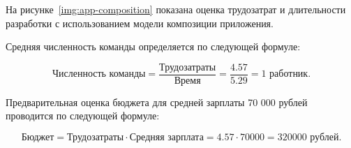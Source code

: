 На рисунке~\ref{img:app-composition} показана оценка трудозатрат и длительности разработки с использованием модели композиции приложения.


Средняя численность команды определяется по следующей формуле:

$$\text{Численность команды} = \frac{\text{Трудозатраты}}{\text{Время}} =
\frac{4.57}{5.29} = 1 \text{ работник.}$$

Предварительная оценка бюджета для средней зарплаты 70 000 рублей проводится по
следующей формуле:

$$\text{Бюджет} = \text{Трудозатраты} \cdot \text{Средняя зарплата} = 4.57 \cdot
70 000 = 320 000\text{ рублей.}$$
